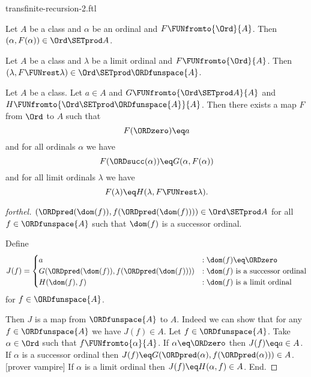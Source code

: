 \documentclass{naproche-library}
\begin{document}
\begin{smodule}[title=Transfinite Recursion II]{transfinite-recursion-2.ftl}
  
\begin{lemma}[forthel,id=transfinite-recursion_029348573987483]
  Let $A$ be a class and $\alpha$ be an ordinal and $F \FUNfromto{\Ord}{A}$.
  Then $(\alpha, F(\alpha)) \in \Ord \SETprod A$.
\end{lemma}

\begin{lemma}[forthel,id=transfinite-recursion_570293857449281]
  Let $A$ be a class and $\lambda$ be a limit ordinal and $F \FUNfromto{\Ord}{A}$.
  Then $(\lambda, F \FUNrest \lambda) \in \Ord \SETprod \ORDfunspace{A}$.
\end{lemma}

\begin{corollary}[forthel,id=transfinite-recursion_298647309184593]
  Let $A$ be a class.
  Let $a \in A$ and $G \FUNfromto{\Ord \SETprod A}{A}$ and $H \FUNfromto{\Ord \SETprod \ORDfunspace{A}}{A}$.
  Then there exists a map $F$ from $\Ord$ to $A$ such that
  \[ F(\ORDzero) \eq a \]
  and for all ordinals $\alpha$ we have
  \[ F(\ORDsucc(\alpha)) \eq G(\alpha, F(\alpha)) \]
  and for all limit ordinals $\lambda$ we have
  \[ F(\lambda) \eq H(\lambda, F \FUNrest \lambda). \]
\end{corollary}
\begin{proof}[forthel]
  $(\ORDpred(\dom(f)), f(\ORDpred(\dom(f)))) \in \Ord \SETprod A$ for all $f \in \ORDfunspace{A}$ such that $\dom(f)$ is a successor ordinal.

  Define  \[ J(f) =
    \begin{cases}
      a
      & : \dom(f) \eq \ORDzero
      \\
      G(\ORDpred(\dom(f)), f(\ORDpred(\dom(f))))
      & : \text{$\dom(f)$ is a successor ordinal}
      \\
      H(\dom(f), f)
      & : \text{$\dom(f)$ is a limit ordinal}
    \end{cases} \]
  for $f \in \ORDfunspace{A}$.

  Then $J$ is a map from $\ORDfunspace{A}$ to $A$.
  Indeed we can show that for any $f \in \ORDfunspace{A}$ we have $J(f) \in A$.
    Let $f \in \ORDfunspace{A}$.
    Take $\alpha \in \Ord$ such that $f \FUNfromto{\alpha}{A}$.
    If $\alpha \eq \ORDzero$ then $J(f) \eq a \in A$.
    If $\alpha$ is a successor ordinal then $J(f) \eq
    G(\ORDpred(\alpha), f(\ORDpred(\alpha))) \in A$.
    [prover vampire]
    If $\alpha$ is a limit ordinal then $J(f) \eq H(\alpha, f) \in A$.
  End.


\end{proof}
\end{smodule}
\end{document}
